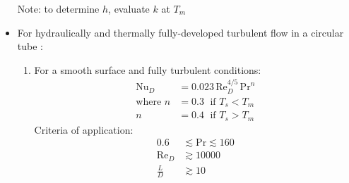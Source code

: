 \begin{itemize}
\begin{figure}[H]
    \end{figure}
    Note: to determine $h$, evaluate $k$ at $T_m$
    \item For  hydraulically and thermally fully-developed \color{blue} turbulent flow \color{black} in a \color{blue} circular tube \color{black}:
    \begin{enumerate}
        \item For a smooth surface and fully turbulent conditions:
        \begin{align*}
            \text{Nu}_D &= 0.023 \, \text{Re}_D^{4/5} \, \text{Pr}^n \\
            \text{where } n &= 0.3 \; \text{ if } T_s < T_m \\
            n &= 0.4 \; \text{ if } T_s > T_m 
        \end{align*}
        Criteria of application:
        \begin{align*}
            0.6 &	\lesssim \text{Pr} 	\lesssim 160 \\
            \text{Re}_D &\gtrsim 10000 \\
            \frac{L}{D} &\gtrsim 10
        \end{align*}
    \end{enumerate}
\end{itemize}
